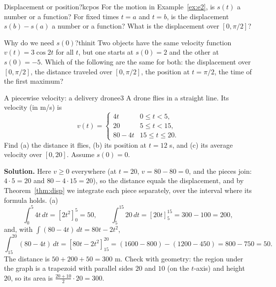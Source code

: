 \documentclass[11pt]{article}
\begin{document}
\begin{kc}{Displacement or position?}{kcpos}
For the motion in Example~\ref{ex:e2}, is $s(t)$ a number or a function? For fixed times $t=a$ and $t=b$, is the displacement $s(b)-s(a)$ a number or a function? What is the displacement over $[0,\pi/2]$?
\end{kc}

\begin{think}{Why do we need $s(0)$?}{thinit}
Two objects have the same velocity function $v(t)=3\cos2t$ for all $t$, but one starts at $s(0)=2$ and the other at $s(0)=-5$. Which of the following are the same for both: the displacement over $[0,\pi/2]$, the distance traveled over $[0,\pi/2]$, the position at $t=\pi/2$, the time of the first maximum?
\end{think}

\begin{exmp}{A piecewise velocity: a delivery drone}{e3}
A drone flies in a straight line. Its velocity (in m/s) is
\[
v(t)=\begin{cases}4t&0\le t<5,\\20&5\le t<15,\\80-4t&15\le t\le20.\end{cases}
\]
Find (a) the distance it flies, (b) its position at $t=12$ s, and (c) its average velocity over $[0,20]$. Assume $s(0)=0$.

\textbf{Solution.} Here $v\ge0$ everywhere (at $t=20$, $v=80-80=0$, and the pieces join: $4\cdot5=20$ and $80-4\cdot15=20$), so the distance equals the displacement, and by Theorem~\ref{thm:disp} we integrate each piece separately, over the interval where its formula holds.
(a) \[\int_0^{5}4t\,dt=\left[2t^2\right]_0^5=50,\qquad\int_5^{15}20\,dt=\left[20t\right]_5^{15}=300-100=200,\]
and, with $\int(80-4t)\,dt=80t-2t^2$,
\[\int_{15}^{20}(80-4t)\,dt=\left[80t-2t^2\right]_{15}^{20}=(1600-800)-(1200-450)=800-750=50.\]
The distance is $50+200+50=300$ m. Check with geometry: the region under the graph is a trapezoid with parallel sides $20$ and $10$ (on the $t$-axis) and height $20$, so its area is $\frac{20+10}2\cdot20=300$. \checkmark


\end{exmp}
\end{document}
